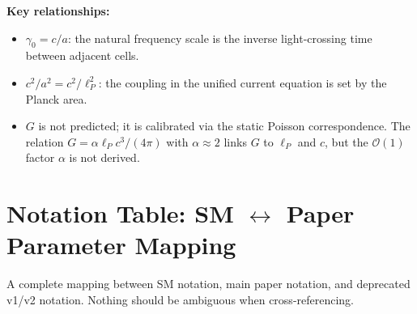 \documentclass[reprint]{revtex4-2}
\begin{document}
\textbf{Key relationships:}
\begin{itemize}
\item $\gamma_0 = c/a$: the natural frequency scale is the inverse light-crossing time between adjacent cells.
\item $c^2/a^2 = c^2/\ell_P^2$: the coupling in the unified current equation is set by the Planck area.
\item $G$ is not predicted; it is calibrated via the static Poisson correspondence. The relation $G = \alpha\ell_P c^3/(4\pi)$ with $\alpha \approx 2$ links $G$ to $\ell_P$ and $c$, but the $\mathcal{O}(1)$ factor $\alpha$ is not derived.
\end{itemize}

\section{Notation Table: SM $\leftrightarrow$ Paper Parameter Mapping}

A complete mapping between SM notation, main paper notation, and deprecated v1/v2 notation. Nothing should be ambiguous when cross-referencing.
\end{document}
